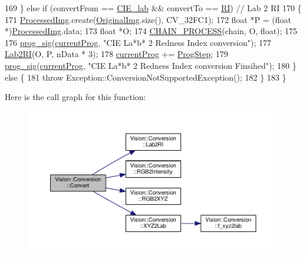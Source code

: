 \begin{DoxyCode}
169   \} \textcolor{keywordflow}{else} \textcolor{keywordflow}{if} (convertFrom == \hyperlink{class_vision_1_1_conversion_a0a21d4ccbb013185f1974d35ec86e388afd9ec9933d500e5eeec6ce3359321b0e}{CIE\_lab} && convertTo == \hyperlink{class_vision_1_1_conversion_a0a21d4ccbb013185f1974d35ec86e388addf2a4063c4fe27e2675fafccdcdd9c1}{RI}) \textcolor{comment}{// Lab 2 RI}
170   \{
171     \hyperlink{class_vision_1_1_image_processing_aa7d65742882cd1b2a1e4e9cb68809211}{ProcessedImg}.create(\hyperlink{class_vision_1_1_image_processing_a77c370dab270158a4e9c634e2d3f48e7}{OriginalImg}.size(), CV\_32FC1);
172     \textcolor{keywordtype}{float} *P = (\textcolor{keywordtype}{float} *)\hyperlink{class_vision_1_1_image_processing_aa7d65742882cd1b2a1e4e9cb68809211}{ProcessedImg}.data;
173     \textcolor{keywordtype}{float} *O;
174     \hyperlink{_image_processing_8h_a6e6f0183cb53c76ef458d4fd34e07bcd}{CHAIN\_PROCESS}(chain, O, \textcolor{keywordtype}{float});
175 
176     \hyperlink{class_vision_1_1_image_processing_ac0c168e16365ff5941791f67ec895663}{prog\_sig}(\hyperlink{class_vision_1_1_image_processing_ac06b3b9501cde8e742aaf99d986af256}{currentProg}, \textcolor{stringliteral}{"CIE La*b* 2 Redness Index conversion"});
177     \hyperlink{class_vision_1_1_conversion_adf3ad076d44a9986332f5078c5fa2cc7}{Lab2RI}(O, P, nData * 3);
178     \hyperlink{class_vision_1_1_image_processing_ac06b3b9501cde8e742aaf99d986af256}{currentProg} += \hyperlink{class_vision_1_1_image_processing_a7438451f9a447a33e9f04bf8e73eae31}{ProgStep};
179     \hyperlink{class_vision_1_1_image_processing_ac0c168e16365ff5941791f67ec895663}{prog\_sig}(\hyperlink{class_vision_1_1_image_processing_ac06b3b9501cde8e742aaf99d986af256}{currentProg}, \textcolor{stringliteral}{"CIE La*b* 2 Redness Index conversion Finsihed"});
180   \} \textcolor{keywordflow}{else} \{
181     \textcolor{keywordflow}{throw} Exception::ConversionNotSupportedException();
182   \}
183 \}
\end{DoxyCode}


Here is the call graph for this function\+:\nopagebreak
\begin{figure}[H]
\begin{center}
\leavevmode
\includegraphics[width=350pt]{class_vision_1_1_conversion_ac78b687a5b6cdf4c0ae812b5d76b13fc_cgraph}
\end{center}
\end{figure}




